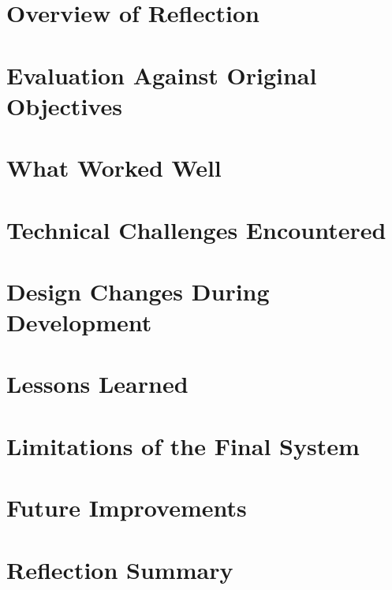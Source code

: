 
\raggedright

\section{Overview of Reflection}

\section{Evaluation Against Original Objectives}

\section{What Worked Well}

\section{Technical Challenges Encountered}

\section{Design Changes During Development}

\section{Lessons Learned}

\section{Limitations of the Final System}

\section{Future Improvements}

\section{Reflection Summary}